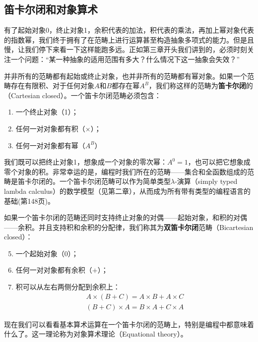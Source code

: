 \documentclass{article}
\begin{document}
\subsection{笛卡尔闭和对象算术}

有了起始对象0，终止对象1，余积代表的加法，积代表的乘法，再加上幂对象代表的指数幂，我们终于拥有了在范畴上进行运算甚至构造抽象多项式的能力。但是且慢，让我们停下来看一下这样能跑多远。正如第三章开头我们讲到的，必须时刻关注一个问题：“某一种抽象的适用范围有多大？什么情况下这一抽象会失效？”

并非所有的范畴都有起始或终止对象，也并非所有的范畴都有幂对象。如果一个范畴存在有限积、对于任何对象$A$和$B$都存在幂$A^B$，我们称这样的范畴为\textbf{笛卡尔闭}的（Cartesian closed）。一个笛卡尔闭范畴必须包含：

\begin{enumerate}
\item 一个终止对象（1）；
\item 任何一对对象都有积（$\times$）；
\item 任何一对对象都有幂（$A^B$）
\end{enumerate}

我们既可以把终止对象1，想象成一个对象的零次幂：$A^0 = 1$，也可以把它想象成零个对象的积。非常幸运的是，编程时我们所在的范畴——集合和全函数组成的范畴是笛卡尔闭的。一个笛卡尔闭范畴可以作为简单类型$\lambda$-演算（simply typed lambda calculus）的数学模型（见第二章），从而成为所有带有类型的编程语言的基础(\cite{Milewski2018}第148页)。

如果一个笛卡尔闭的范畴还同时支持终止对象的对偶——起始对象，和积的对偶——余积。并且支持积和余积的分配律，我们称其为\textbf{双笛卡尔闭}范畴（Bicartesian closed）：

\begin{enumerate}
  \setcounter{enumi}{4}
  \item 一个起始对象（0）；
  \item 任何一对对象都有余积（$+$）；
  \item 积可以从左右两侧分配到余积上：
  \[
  \begin{array}{l}
  A \times (B + C) = A \times B + A \times C \\
  (B + C) \times A = B \times A + C \times A
  \end{array}
  \]
\end{enumerate}

现在我们可以看看基本算术运算在一个笛卡尔闭的范畴上，特别是编程中都意味着什么了。这一理论称为对象算术理论（Equational theory）。
\end{document}
